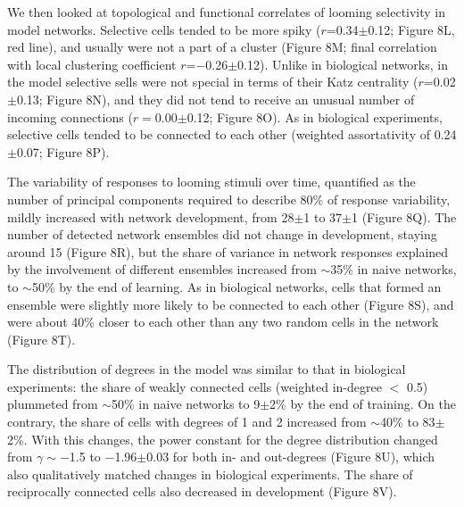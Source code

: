 \documentclass{article}
\begin{document}
We then looked at topological and functional correlates of looming selectivity in model networks. Selective cells tended to be more spiky ($r$=0.34$\pm$0.12; Figure 8L, red line), and usually were not a part of a cluster (Figure 8M; final correlation with local clustering coefficient $r$=$-$0.26$\pm$0.12). Unlike in biological networks, in the model selective sells were not special in terms of their Katz centrality ($r$=0.02$\pm$0.13; Figure 8N), and they did not tend to receive an unusual number of incoming connections ($r=$0.00$\pm$0.12; Figure 8O). As in biological experiments, selective cells tended to be connected to each other (weighted assortativity of 0.24$\pm$0.07; Figure 8P). %

The variability of responses to looming stimuli over time, quantified as the number of principal components required to describe 80\% of response variability, mildly increased with network development, from 28$\pm$1 to 37$\pm$1 (Figure 8Q). The number of detected network ensembles did not change in development, staying around 15 (Figure 8R), but the share of variance in network responses explained by the involvement of different ensembles increased from $\sim$35\% in naive networks, to $\sim$50\% by the end of learning. As in biological networks, cells that formed an ensemble were slightly more likely to be connected to each other (Figure 8S), and were about 40\% closer to each other than any two random cells in the network (Figure 8T).

The distribution of degrees in the model was similar to that in biological experiments: the share of weakly connected cells (weighted in-degree $<$ 0.5) plummeted from $\sim$50\% in naive networks to 9$\pm$2\% by the end of training. On the contrary, the share of cells with degrees of 1 and 2 increased from $\sim$40\% to 83$\pm$2\%. With this changes, the power constant for the degree distribution changed from $\gamma \sim -$1.5 to $-$1.96$\pm$0.03 for both in- and out-degrees (Figure 8U), which also qualitatively matched changes in biological experiments. The share of reciprocally connected cells also decreased in development (Figure 8V).
\end{document}

